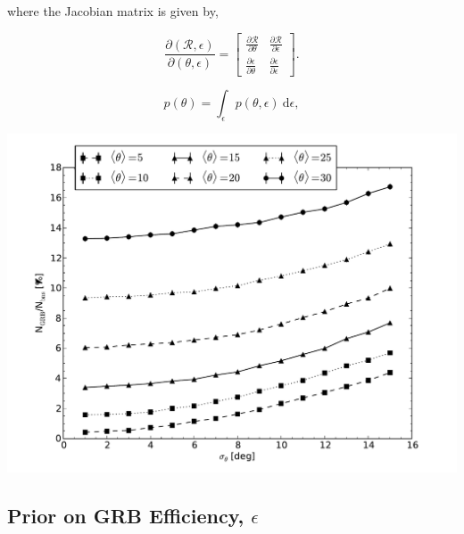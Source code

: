 \documentclass[a0,landscape]{a0poster}
\newcommand{\cbcrate}{{{\mathcal R}}}
\newcommand{\diff}{{\mathrm d}}
\begin{document}
\begin{multicols}{4}
where the Jacobian matrix is given by,
\begingroup
\renewcommand*{\arraystretch}{1.5}

\begin{equation}
\frac{\partial (\cbcrate,\epsilon)}{\partial(\theta,\epsilon)} =
\begin{bmatrix}
\frac{\partial \cbcrate}{\partial \theta} & \frac{\partial \cbcrate}{\partial \epsilon} \\
\frac{\partial \epsilon}{\partial \theta} & \frac{\partial \epsilon}{\partial \epsilon}
\end{bmatrix}.
\end{equation}

\endgroup

\begin{equation}
p(\theta) = \int_{\epsilon} p(\theta,\epsilon)~\diff \epsilon,
\end{equation}


\begin{center}\vspace{1cm}
    \includegraphics[width=0.48\linewidth]{theta_dist_grbfrac.pdf}
\end{center}\vspace{1cm}


\subsection*{Prior on GRB Efficiency, $\epsilon$}


\end{multicols}
\end{document}
